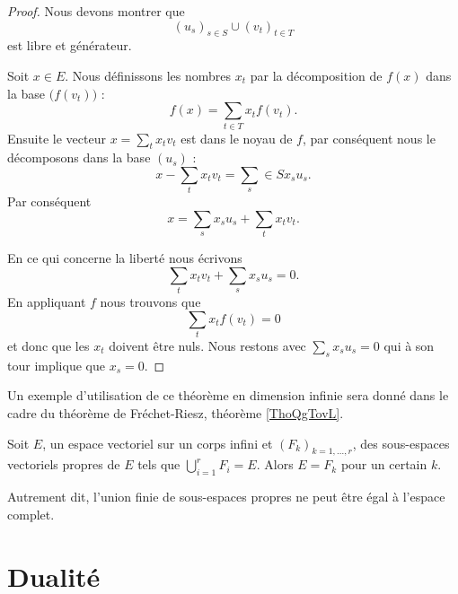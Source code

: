 \begin{proof}
    Nous devons montrer que 
    \begin{equation}
          (u_s)_{s\in S}\cup (v_t)_{t\in T}
    \end{equation}
    est libre et générateur.

    Soit \( x\in E\). Nous définissons les nombres \( x_t\) par la décomposition de \( f(x)\) dans la base \( \big( f(v_t) \big)\) :
    \begin{equation}
        f(x)=\sum_{t\in T}x_tf(v_t).
    \end{equation}
    Ensuite le vecteur \( x=\sum_tx_tv_t\) est dans le noyau de \( f\), par conséquent nous le décomposons dans la base \( (u_s)\) :
    \begin{equation}
        x-\sum_tx_tv_t=\sum_s\in S x_su_s.
    \end{equation}
    Par conséquent
    \begin{equation}
        x=\sum_sx_su_s+\sum_tx_tv_t.
    \end{equation}
    
    En ce qui concerne la liberté nous écrivons
    \begin{equation}
        \sum_tx_tv_t+\sum_sx_su_s=0.
    \end{equation}
    En appliquant \( f\) nous trouvons que 
    \begin{equation}
        \sum_tx_tf(v_t)=0
    \end{equation}
    et donc que les \( x_t\) doivent être nuls. Nous restons avec \( \sum_sx_su_s=0\) qui à son tour implique que \( x_s=0\).
\end{proof}
Un exemple d'utilisation de ce théorème en dimension infinie sera donné dans le cadre du théorème de Fréchet-Riesz, théorème \ref{ThoQgTovL}.

\begin{proposition}   \label{PropTVKbxU}
    Soit \( E\), un espace vectoriel sur un corps infini et \( (F_k)_{k=1,\ldots, r}\), des sous-espaces vectoriels propres de \( E\) tels que \( \bigcup_{i=1}^rF_i=E\). Alors \( E=F_k\) pour un certain \( k\).

    Autrement dit, l'union finie de sous-espaces propres ne peut être égal à l'espace complet.
\end{proposition}


\section{Dualité}

